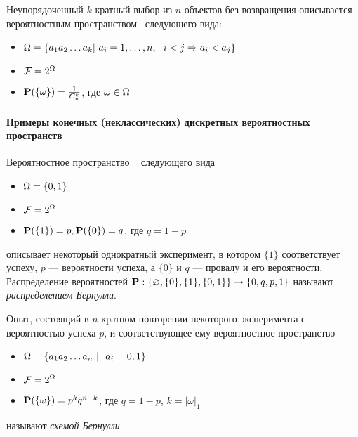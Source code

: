 \begin{example}
Неупорядоченный $k$-кратный выбор из $n$ объектов без возвращения описывается вероятностным пространством \PSP~следующего вида:
\begin{itemize}
		\item $\Omega = \{a_1a_2\ldots a_k |~a_i = 1, \ldots, n,~~i < j \Rightarrow a_i < a_j \}$
		\item $\mathcal{F} = 2^{\Omega}$
		\item $\mathbf{P}(\{\omega\}) = \frac{1}{C_n^k}$, где $\omega \in \Omega$
	\end{itemize}
\end{example}

\paragraph{Примеры конечных (неклассических) дискретных вероятностных пространств}

\begin{example}
	Вероятностное пространство \PSP~ следующего вида
	\begin{itemize}
		\item $\Omega = \{0, 1\}$
		\item $\mathcal{F} = 2^{\Omega}$
		\item $\mathbf{P}(\{1\}) = p, \mathbf{P}(\{0\}) = q$, где $q = 1 - p$
	\end{itemize}
	описывает некоторый однократный эксперимент, в котором $\{1\}$ соответствует успеху, $p$ --- вероятности успеха, а $\{0\}$ и $q$ --- провалу и его вероятности. Распределение вероятностей $\mathbf{P}: \{\varnothing, \{0\}, \{1\}, \{0, 1\}\} \rightarrow \{0, q, p, 1\}$ называют {\it распределением Бернулли}.
\end{example}

\begin{example}
	Опыт, состоящий в $n$-кратном повторении некоторого эксперимента с вероятностью успеха $p$, и соответствующее ему вероятностное пространство
	\begin{itemize}
		\item $\Omega = \{a_1a_2\ldots a_n~|~~a_i = 0, 1\}$
		\item $\mathcal{F} = 2^{\Omega}$
		\item $\mathbf{P}(\{\omega\}) = p^k q^{n-k}$, где $q = 1 - p$, $k = |\omega|_1$
	\end{itemize}
	называют {\it схемой Бернулли}
\end{example}

